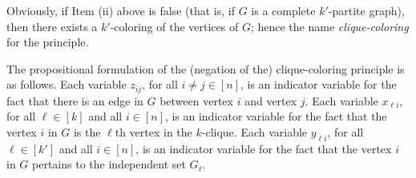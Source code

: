Obviously, if Item (ii) above is false
(that is, if $G$ is a complete $k'$-partite graph),
then there exists a $k'$-coloring of
the vertices of $G$; hence the name \emph{clique-coloring} for the principle.

The propositional formulation of the (negation of the)
clique-coloring principle is as follows.
Each variable $z_{ij}$, for all $i\ne j \in [n]$,
is an indicator variable for the fact that there is an edge in $G$
between vertex $i$ and vertex $j$.
Each variable $x_{\ell i}$, for all $\ell\in[k]$ and all $i\in[n]$,
is an indicator variable for the fact that the vertex $i$ in $G$
is the $\ell$th vertex in the $k$-clique.
Each variable $ y_{\ell i}$, for all $\ell\in[k']$ and all $i\in[n]$,
is an indicator variable for the fact that the vertex $i$ in $G$
pertains to the independent set $G_\ell$.

